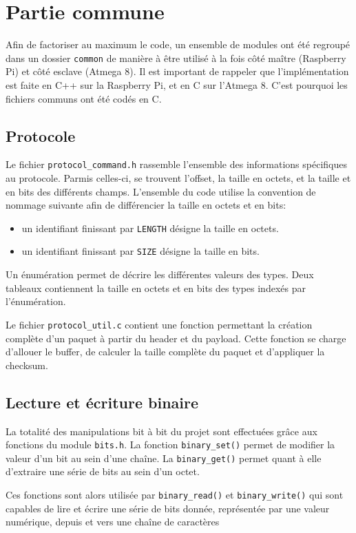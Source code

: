\section{Partie commune}
Afin de factoriser au maximum le code, un ensemble de modules ont été regroupé dans un dossier \texttt{common} de manière à être utilisé à la fois côté maître (Raspberry Pi) et côté esclave (Atmega 8).
Il est important de rappeler que l'implémentation est faite en C++ sur la Raspberry Pi, et en C sur l'Atmega 8. C'est pourquoi les fichiers communs ont été codés en C.

\subsection{Protocole}
Le fichier \texttt{protocol\_command.h} rassemble l'ensemble des informations spécifiques au protocole. 
Parmis celles-ci, se trouvent l'offset, la taille en octets, et la taille et en bits des différents champs.
L'ensemble du code utilise la convention de nommage suivante afin de différencier la taille en octets et en bits:
\begin{itemize}
\item un identifiant finissant par \texttt{LENGTH} désigne la taille en octets.
\item un identifiant finissant par \texttt{SIZE} désigne la taille en bits.
\end{itemize}

Un énumération permet de décrire les différentes valeurs des types.
Deux tableaux contiennent la taille en octets et en bits des types indexés par l'énumération.


Le fichier \texttt{protocol\_util.c} contient une fonction permettant la création complète d'un paquet à partir du header et du payload.
Cette fonction se charge d'allouer le buffer, de calculer la taille complète du paquet et d'appliquer la checksum.

\subsection{Lecture et écriture binaire}
La totalité des manipulations bit à bit du projet sont effectuées grâce aux fonctions du module \texttt{bits.h}. La fonction \texttt{binary\_set()} permet de modifier la valeur d'un bit au sein d'une chaîne. La \texttt{binary\_get()} permet quant à elle d'extraire une série de bits au sein d'un octet.

Ces fonctions sont alors utilisée par \texttt{binary\_read()} et \texttt{binary\_write()} qui sont capables de lire et écrire une série de bits donnée, représentée par une valeur numérique, depuis et vers une chaîne de caractères


